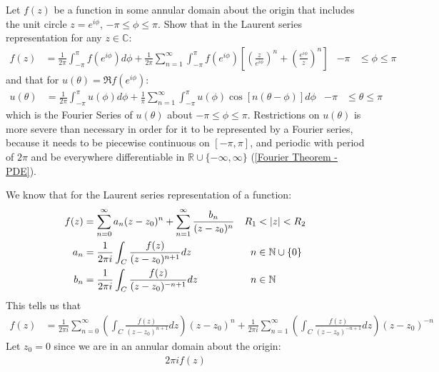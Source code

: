 \documentclass[12pt, english]{book}
\makeatletter
\renewenvironment{proof}[1][\proofname]{\par
	\pushQED{\qed}%
	\normalfont \topsep6\p@\@plus6\p@\relax
	\list{}{%
		\settowidth{\leftmargin}{\itshape\proofname:\hskip\labelsep}%
		\setlength{\labelwidth}{0pt}%
		\setlength{\itemindent}{-\leftmargin}%
	}%
	\item[\hskip\labelsep\itshape#1\@addpunct{:}]\ignorespaces
	}{ \popQED\endlist\@endpefalse}
\makeatother
\begin{document}
	\begin{example}
		Let \(f(z)\) be a function in some annular domain about the origin that includes the unit circle \(z = e^{i\phi}\), \(-\pi \leq \phi \leq \pi\). Show that in the Laurent series representation for any \(z \in \mathbb{C}\):
		\begin{align*}
			f(z) &= \frac{1}{2\pi} \int_{-\pi}^{\pi} f(e^{i\phi}) d \phi
				+ \frac{1}{2\pi} \sum_{n=1}^{\infty} \int_{-\pi}^{\pi} f(e^{i\phi}) \left[\left(\frac{z}{e^{i\phi}}\right)^n + \left(\frac{e^{i\phi}}{z}\right)^n\right]
				& -\pi &\leq \phi \leq \pi
		\end{align*}
		and that for \(u(\theta) = \Re{f(e^{i\phi})}\):
		\begin{align*}
			u(\theta) &= \frac{1}{2\pi} \int_{-\pi}^{\pi} u(\phi) d \phi
				+ \frac{1}{\pi} \sum_{n=1}^{\infty} \int_{-\pi}^{\pi} u(\phi) \cos[n(\theta-\phi)] d\phi
				& -\pi &\leq \theta \leq \pi
		\end{align*}
		which is the Fourier Series of \(u(\theta)\) about \(-\pi \leq \phi \leq \pi\). Restrictions on \(u(\theta)\) is more severe than necessary in order for it to be represented by a Fourier series, because it needs to be piecewise continuous on \([-\pi,\pi]\), and periodic with period of \(2\pi\) and be everywhere differentiable in \(\mathbb{R}\cup\{-\infty, \infty\}\) (\cref{Fourier Theorem - PDE}).
		\begin{proof}
			{\color{Grey}
			We know that for the Laurent series representation of a function:
			\begin{align*}
				f(z) &= \sum_{n=0}^{\infty} a_n(z-z_0)^n + \sum_{n=1}^{\infty} \frac{b_n}{(z-z_0)^n}
					& R_1 &< \abs{z} < R_2 \\
				a_n &= \frac{1}{2\pi i} \int_{C} \frac{f(z)}{(z-z_0)^{n+1}} dz
					& n &\in \mathbb{N} \cup \{0\} \\
				b_n &= \frac{1}{2\pi i} \int_{C} \frac{f(z)}{(z-z_0)^{-n+1}} dz 
					& n &\in \mathbb{N}
			\end{align*}
			This tells us that 
			\begin{align*}
				f(z) &= \frac{1}{2\pi i} \sum_{n=0}^{\infty} 
				\left( \int_{C} \frac{f(z)}{(z-z_0)^{n+1}} dz \right) (z-z_0)^n
				+ \frac{1}{2\pi i} \sum_{n=1}^{\infty} \left(\int_{C} \frac{f(z)}{(z-z_0)^{-n+1}} dz \right) (z-z_0)^{-n}
			\end{align*}
			Let \(z_0 = 0\) since we are in an annular domain about the origin:
			\begin{align*}
				2\pi i f(z) 

\end{align*}}
\end{proof}
\end{example}
\end{document}
